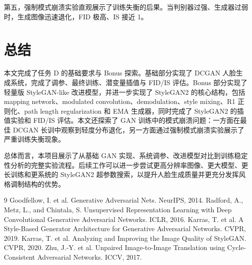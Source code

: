 \documentclass[UTF8,a4paper,12pt]{ctexart}
\begin{document}
第五，强制模式崩溃实验直观展示了训练失衡的后果。当判别器过强、生成器过弱时，生成图像迅速退化，FID 极高、IS 接近 1。

\section{总结}

本文完成了任务 D 的基础要求与 Bonus 探索。基础部分实现了 DCGAN 人脸生成系统，完成了调参、最终训练、潜变量插值与 FID/IS 评估。Bonus 部分实现了轻量版 StyleGAN-like 改进模型，并进一步实现了 StyleGAN2 的核心结构，包括 mapping network、modulated convolution、demodulation、style mixing、R1 正则化、path length regularization 和 EMA 生成器，同时完成了 StyleGAN2 的插值实验和 FID/IS 评估。本文还探索了 GAN 训练中的模式崩溃问题：一方面在最佳 DCGAN 长训中观察到轻度分布退化，另一方面通过强制模式崩溃实验展示了严重训练失衡现象。

总体而言，本项目展示了从基础 GAN 实现、系统调参、改进模型对比到训练稳定性分析的完整实验流程。后续工作可以进一步尝试更高分辨率图像、更大模型、更长训练和更系统的 StyleGAN2 超参数搜索，以提升人脸生成质量并更充分发挥风格调制结构的优势。

\begin{thebibliography}{9}
 Goodfellow, I. et al. Generative Adversarial Nets. NeurIPS, 2014.
 Radford, A., Metz, L., and Chintala, S. Unsupervised Representation Learning with Deep Convolutional Generative Adversarial Networks. ICLR, 2016.
 Karras, T. et al. A Style-Based Generator Architecture for Generative Adversarial Networks. CVPR, 2019.
 Karras, T. et al. Analyzing and Improving the Image Quality of StyleGAN. CVPR, 2020.
 Zhu, J.-Y. et al. Unpaired Image-to-Image Translation using Cycle-Consistent Adversarial Networks. ICCV, 2017.
\end{thebibliography}
\end{document}
